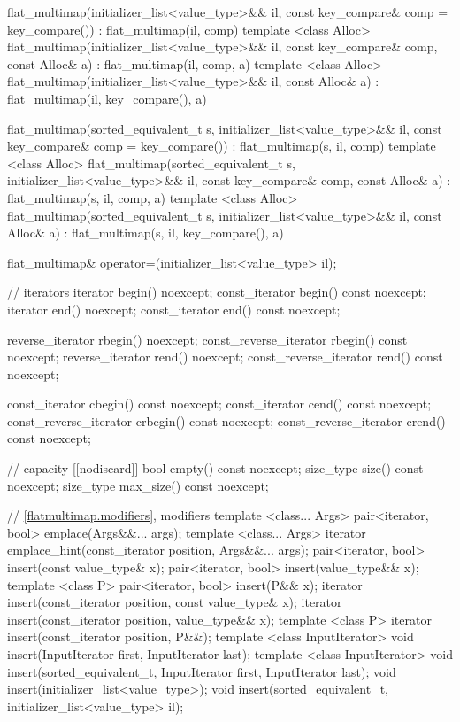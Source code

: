 \begin{codeblock}
\begin{codeblock}
\begin{codeblock}
\begin{addedblock}
\begin{codeblock}
{{    flat_multimap(initializer_list<value_type>&& il,
                  const key_compare& comp = key_compare())
        : flat_multimap(il, comp) { }
    template <class Alloc>
      flat_multimap(initializer_list<value_type>&& il,
                    const key_compare& comp, const Alloc& a)
        : flat_multimap(il, comp, a) { }
    template <class Alloc>
      flat_multimap(initializer_list<value_type>&& il, const Alloc& a)
        : flat_multimap(il, key_compare(), a) { }

    flat_multimap(sorted_equivalent_t s, initializer_list<value_type>&& il,
                  const key_compare& comp = key_compare())
        : flat_multimap(s, il, comp) { }
    template <class Alloc>
      flat_multimap(sorted_equivalent_t s, initializer_list<value_type>&& il,
                    const key_compare& comp, const Alloc& a)
        : flat_multimap(s, il, comp, a) { }
    template <class Alloc>
      flat_multimap(sorted_equivalent_t s, initializer_list<value_type>&& il,
                    const Alloc& a)
        : flat_multimap(s, il, key_compare(), a) { }

    flat_multimap& operator=(initializer_list<value_type> il);

    // iterators
    iterator                begin() noexcept;
    const_iterator          begin() const noexcept;
    iterator                end() noexcept;
    const_iterator          end() const noexcept;

    reverse_iterator        rbegin() noexcept;
    const_reverse_iterator  rbegin() const noexcept;
    reverse_iterator        rend() noexcept;
    const_reverse_iterator  rend() const noexcept;

    const_iterator          cbegin() const noexcept;
    const_iterator          cend() const noexcept;
    const_reverse_iterator  crbegin() const noexcept;
    const_reverse_iterator  crend() const noexcept;

    // capacity
    [[nodiscard]] bool empty() const noexcept;
    size_type size() const noexcept;
    size_type max_size() const noexcept;

    // \ref{flatmultimap.modifiers}, modifiers
    template <class... Args> pair<iterator, bool> emplace(Args&&... args);
    template <class... Args>
      iterator emplace_hint(const_iterator position, Args&&... args);
    pair<iterator, bool> insert(const value_type& x);
    pair<iterator, bool> insert(value_type&& x);
    template <class P> pair<iterator, bool> insert(P&& x);
    iterator insert(const_iterator position, const value_type& x);
    iterator insert(const_iterator position, value_type&& x);
    template <class P>
      iterator insert(const_iterator position, P&&);
    template <class InputIterator>
      void insert(InputIterator first, InputIterator last);
    template <class InputIterator>
      void insert(sorted_equivalent_t, InputIterator first, InputIterator last);
    void insert(initializer_list<value_type>);
    void insert(sorted_equivalent_t, initializer_list<value_type> il);

}}
\end{codeblock}
\end{addedblock}
\end{codeblock}
\end{codeblock}
\end{codeblock}
